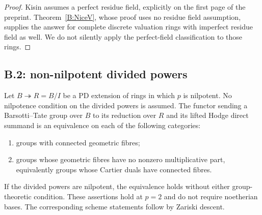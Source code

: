 \begin{proof}
Kisin assumes a perfect residue field, explicitly on the first page
of the preprint. Theorem~\ref{B:NiceV}, whose proof uses no residue
field assumption, supplies the answer for complete discrete
valuation rings with imperfect residue field as well. We do not
silently apply the perfect-field classification to those rings.
\end{proof}

\subsection{B.2: non-nilpotent divided powers}

\begin{theorem}
\label{B:NiceIV}
Let $B\twoheadrightarrow R=B/I$ be a PD extension of rings in which
$p$ is nilpotent. No nilpotence condition on the divided powers is
assumed. The functor sending a Barsotti--Tate group over $B$ to its
reduction over $R$ and its lifted Hodge direct summand is an
equivalence on each of the following categories:
\begin{enumerate}
 \item groups with connected geometric fibres;
 \item groups whose geometric fibres have no nonzero multiplicative
 part, equivalently groups whose Cartier duals have connected fibres.
\end{enumerate}
If the divided powers are nilpotent, the equivalence holds without
either group-theoretic condition. These assertions hold at $p=2$
and do not require noetherian bases. The corresponding scheme
statements follow by Zariski descent.
\end{theorem}

